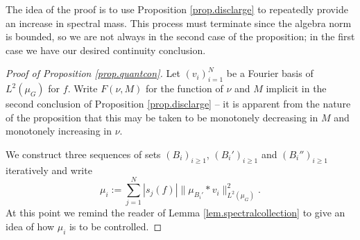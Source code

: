 \documentclass[12pt]{amsart}
\numberwithin{equation}{section}
\theoremstyle{plain}
\theoremstyle{definition}
\renewcommand{\geq}{\geqslant}
\begin{document}
The idea of the proof is to use Proposition \ref{prop.disclarge} to repeatedly provide an increase in spectral mass.  This process must terminate since the algebra norm is bounded, so we are not always in the second case of the proposition; in the first case we have our desired continuity conclusion.
\begin{proof}[Proof of Proposition \ref{prop.quantcon}]  
Let $(v_i)_{i=1}^N$ be a Fourier basis of $L^2(\mu_G)$ for $f$.  Write $F(\nu,M)$ for the function of $\nu$ and $M$ implicit in the second conclusion of Proposition \ref{prop.disclarge} -- it is apparent from the nature of the proposition that this may be taken to be monotonely decreasing in $M$ and monotonely increasing in $\nu$.

We construct three sequences of sets $(B_i)_{i\geq 1}$, $(B_i')_{i\geq 1}$ and $(B_i'')_{i\geq 1}$ iteratively and write
\begin{equation*}
\mu_i:=\sum_{j=1}^N{|s_j(f)|\|\mu_{B_i'}\ast v_i\|_{L^2(\mu_G)}^2}.
\end{equation*}
At this point we remind the reader of Lemma \ref{lem.spectralcollection} to give an idea of how $\mu_i$ is to be controlled.


\end{proof}
\end{document}
